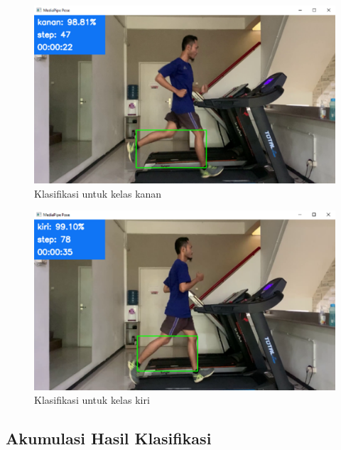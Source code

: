 \begin{figure}[H]
  \centering
  \includegraphics[scale=0.8]{gambar/klasifikasi kanan.png}
  \caption{Klasifikasi untuk kelas kanan}
  \label{fig:KlasifikasiKanan}
\end{figure}

\begin{figure}[H]
  \centering
  \includegraphics[scale=0.8]{gambar/klasifikasi kiri.png}
  \caption{Klasifikasi untuk kelas kiri}
  \label{fig:KlasifikasiKiri}
\end{figure}


\subsection{Akumulasi Hasil Klasifikasi}
\label{subsec:HasilDeteksi}

